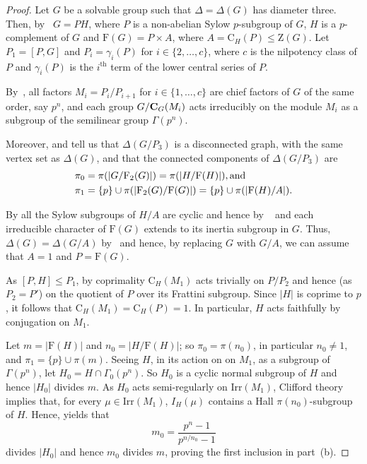 \documentclass{amsart}
\def\cent#1#2{\mathrm{C}_{{#1}}{{(#2)}}}
\def\irr#1{\mathrm{Irr}(#1)}
\begin{document}
\begin{proof}
  Let $G$ be a solvable group such that $\Delta = \Delta(G)$ has diameter three.
  Then,  by~\cite[Theorem~A]{CDPS} $G = PH$, where $P$ is a non-abelian Sylow $p$-subgroup of $G$, 
  $H$ is a $p$-complement of $G$ and  $\mathrm{F}(G) = P \times A$, where $A = \cent HP \leq \mathrm{Z}(G)$.
Let  $P_1 = [P, G]$ and $P_i = \gamma_i(P)$ for $i\in\{2,\ldots, c\}$, where  $c$ is the nilpotency class of $P$ and $\gamma_i(P)$ is the $i^{\mathrm{th}}$ term of the lower central series of $P$.


By~\cite[Theorem~A]{CDPS},   all factors $M_i = P_i/P_{i+1}$ for  $i \in \{1, \ldots,  c\}$ are chief factors of $G$ of the same
  order, say $p^n$, and each group $G/{\bf C}_G(M_i)$ acts irreducibly on the module  $M_i$ as a  subgroup of the  semilinear
  group $\Gamma(p^n)$.


Moreover, \cite[Theorem~A]{CDPS} and  \cite[Remark 4.4]{CDPS} tell us that $\Delta(G/P_3)$ is a  disconnected graph,  with the same vertex set as $\Delta(G)$, and that the connected components of
  $\Delta(G/P_3)$ are 
\begin{align*}\pi_0 &= \pi(|G/\mathrm{F}_2(G)|) = \pi(|H/\mathrm{F}(H)|), \hbox{and}\\%
\pi_1& = \{ p \} \cup \pi(|\mathrm{F}_2(G)/\mathrm{F}(G)|) = \{ p \} \cup \pi(|\mathrm{F}(H)/A|).
\end{align*} 

By \cite[Theorem~A(b)]{CDPS} all the Sylow subgroups of $H/A$ are cyclic and hence by ~\cite[Corollary 11.22]{isaacs} and
\cite[Corollary 11.31]{isaacs} each irreducible character of $\mathrm{F}(G)$ extends to its inertia subgroup in $G$.
Thus, $\Delta(G) = \Delta(G/A)$ by~\cite[Lemma 2.4]{CDPS} and hence, by replacing $G$ with $G/A$, we can assume that $A  = 1$ and $P = \mathrm{F}(G)$.

As $[P, H] \leq P_1$, by coprimality $\cent H{M_1}$ acts trivially on $P/P_2$ and hence (as $P_2 = P'$)  on the quotient of $P$ over its Frattini subgroup. Since
$|H|$ is coprime to $p$, it follows that $\cent H{M_1} = \cent HP = 1$. In particular, $H$ acts faithfully by conjugation on $M_1$.

Let  $m = |\mathrm{F}(H)|$ and  $n_0 = |H/\mathrm{F}(H)|$; so 
$\pi_0 = \pi(n_0)$, in particular $n_0\ne1$, and $\pi_1 = \{p \} \cup \pi(m)$.
Seeing  $H$, in its action on on $M_1$,   as a  subgroup of $\Gamma(p^n)$, let $H_0 = H \cap \Gamma_0(p^n)$. So $H_0$
is a cyclic normal subgroup of $H$ and hence $|H_0|$ divides $m$. 
As $H_0$ acts semi-regularly on $\irr{M_1}$, Clifford theory implies that, for every $\mu \in \irr{M_1}$,
$I_H(\mu)$ contains a Hall $\pi(n_0)$-subgroup of $H$. Hence, \cite[Lemma~3.5]{CDPS} yields that
$$m_0 = \frac{p^n -1}{p^{n/n_0}-1}$$
divides
$|H_0|$ and hence $m_0$ divides $m$, proving the first inclusion in part~(b). 


\end{proof}
\end{document}
